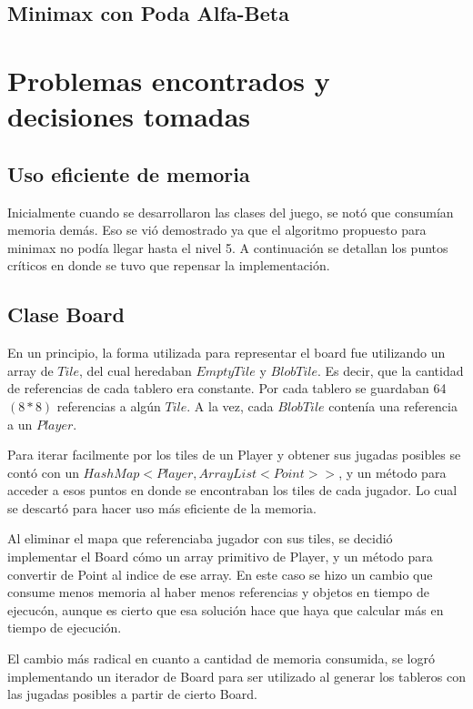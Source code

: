 \documentclass[10pt,a4paper,notitlepage,draft]{article}
\begin{document}
\subsection{Minimax con Poda Alfa-Beta}
\section{Problemas encontrados y decisiones tomadas}
\subsection{Uso eficiente de memoria}
  Inicialmente cuando se desarrollaron las clases del juego, se notó que consumían memoria demás.
  Eso se vió demostrado ya que el algoritmo propuesto para minimax no podía llegar hasta el nivel 5.
  A continuación se detallan los puntos críticos en donde se tuvo que repensar la implementación.

  \subsection{Clase Board}
    En un principio, la forma utilizada para representar el board fue utilizando un array de $Tile$, del cual heredaban $EmptyTile$ y $BlobTile$.
    Es decir, que la cantidad de referencias de cada tablero era constante.
    Por cada tablero se guardaban 64 $(8 * 8)$ referencias a algún $Tile$.  A la vez, cada $BlobTile$ contenía una referencia a un $Player$.

    Para iterar facilmente por los tiles de un Player y obtener sus jugadas posibles se contó con un $HashMap<Player, ArrayList<Point>>$, y un método para acceder a esos  puntos en donde se encontraban los tiles de cada jugador. Lo cual se descartó para hacer uso más eficiente de la memoria.

    Al eliminar el mapa que referenciaba jugador con sus tiles, se decidió implementar el Board cómo un array primitivo de Player, y un método para convertir de Point al indice de ese array.
    En este caso se hizo un cambio que consume menos memoria al haber menos referencias y objetos en tiempo de ejecucón, aunque es cierto que esa solución hace que haya que calcular más en tiempo de ejecución.

    El cambio más radical en cuanto a cantidad de memoria consumida, se logró implementando un iterador de Board para ser utilizado al generar los tableros con
    las jugadas posibles a partir de cierto Board.
\end{document}
